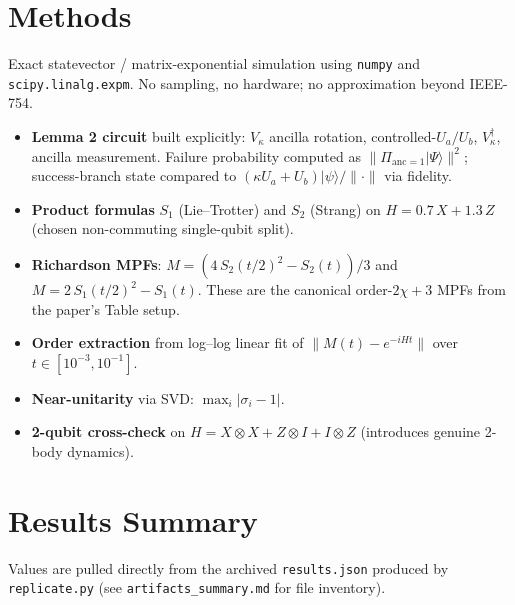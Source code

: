 \documentclass[11pt]{article}
\begin{document}
\section{Methods}
Exact statevector / matrix-exponential simulation using \texttt{numpy} and
\texttt{scipy.linalg.expm}. No sampling, no hardware; no approximation beyond IEEE-754.
\begin{itemize}
  \item \textbf{Lemma 2 circuit} built explicitly: $V_\kappa$ ancilla rotation,
        controlled-$U_a / U_b$, $V_\kappa^\dagger$, ancilla measurement. Failure probability
        computed as $\|\Pi_{\text{anc}=1}|\Psi\rangle\|^2$; success-branch state compared to
        $(\kappa U_a + U_b)|\psi\rangle / \|\cdot\|$ via fidelity.
  \item \textbf{Product formulas} $S_1$ (Lie--Trotter) and $S_2$ (Strang) on
        $H = 0.7\,X + 1.3\,Z$ (chosen non-commuting single-qubit split).
  \item \textbf{Richardson MPFs}: $M = (4\,S_2(t/2)^2 - S_2(t))/3$ and
        $M = 2\,S_1(t/2)^2 - S_1(t)$. These are the canonical order-$2\chi+3$ MPFs from the
        paper's Table setup.
  \item \textbf{Order extraction} from log--log linear fit of
        $\|M(t) - e^{-iHt}\|$ over $t \in [10^{-3}, 10^{-1}]$.
  \item \textbf{Near-unitarity} via SVD: $\max_i |\sigma_i - 1|$.
  \item \textbf{2-qubit cross-check} on $H = X\otimes X + Z\otimes I + I \otimes Z$
        (introduces genuine 2-body dynamics).
\end{itemize}

\section{Results Summary}
Values are pulled directly from the archived \texttt{results.json} produced by
\texttt{replicate.py} (see \texttt{artifacts\_summary.md} for file inventory).
\end{document}
